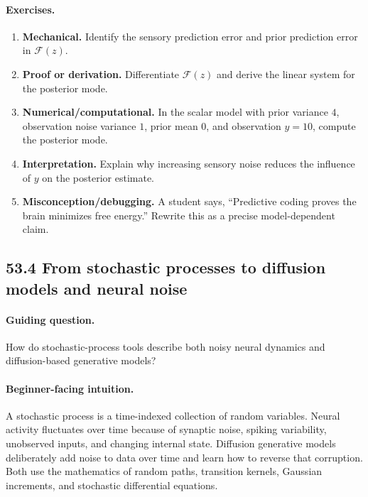 \paragraph{Exercises.}
\begin{enumerate}[label=\textbf{53.3.\arabic*.}, leftmargin=*]
\item \textbf{Mechanical.} Identify the sensory prediction error and prior prediction error in \(\mathcal F(z)\).
\item \textbf{Proof or derivation.} Differentiate \(\mathcal F(z)\) and derive the linear system for the posterior mode.
\item \textbf{Numerical/computational.} In the scalar model with prior variance \(4\), observation noise variance \(1\), prior mean \(0\), and observation \(y=10\), compute the posterior mode.
\item \textbf{Interpretation.} Explain why increasing sensory noise reduces the influence of \(y\) on the posterior estimate.
\item \textbf{Misconception/debugging.} A student says, ``Predictive coding proves the brain minimizes free energy.'' Rewrite this as a precise model-dependent claim.
\end{enumerate}

\subsection{53.4 From stochastic processes to diffusion models and neural noise}

\paragraph{Guiding question.}
How do stochastic-process tools describe both noisy neural dynamics and diffusion-based generative models?

\paragraph{Beginner-facing intuition.}
A stochastic process is a time-indexed collection of random variables. Neural activity fluctuates over time because of synaptic noise, spiking variability, unobserved inputs, and changing internal state. Diffusion generative models deliberately add noise to data over time and learn how to reverse that corruption. Both use the mathematics of random paths, transition kernels, Gaussian increments, and stochastic differential equations.

